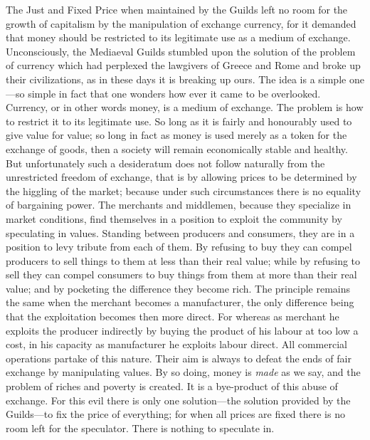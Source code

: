 \documentclass{book}
\begin{document}
The Just and Fixed Price when maintained by the Guilds left no room for the growth of capitalism by the manipulation of exchange currency, for it demanded that money should be restricted to its legitimate use as a medium of exchange. Unconsciously, the Mediaeval Guilds stumbled upon the solution of the problem of currency which had perplexed the lawgivers of Greece and Rome and broke up their civilizations, as in these days it is breaking up ours. The idea is a simple one—so simple in fact that one wonders how ever it came to be overlooked. Currency, or in other words money, is a medium of exchange. The problem is how to restrict it to its legitimate use. So long as it is fairly and honourably used to give value for value; so long in fact as money is used merely as a token for the exchange of goods, then a society will remain economically stable and healthy. But unfortunately such a desideratum does not follow naturally from the unrestricted freedom of exchange, that is by allowing prices to be determined by the higgling of the market; because under such circumstances there is no equality of bargaining power. The merchants and middlemen, because they specialize in market conditions, find themselves in a position to exploit the community by speculating in values. Standing between producers and consumers, they are in a position to levy tribute from each of them. By refusing to buy they can compel producers to sell things to them at less than their real value; while by refusing to sell they can compel consumers to buy things from them at more than their real value; and by pocketing the difference they become rich. The principle remains the same when the merchant becomes a manufacturer, the only difference being that the exploitation becomes then more direct. For whereas as merchant he exploits the producer indirectly by buying the product of his labour at too low a cost, in his capacity as manufacturer he exploits labour direct. All commercial operations partake of this nature. Their aim is always to defeat the ends of fair exchange by manipulating values. By so doing, money is \emph{made} as we say, and the problem of riches and poverty is created. It is a bye-product of this abuse of exchange. For this evil there is only one solution—the solution provided by the Guilds—to fix the price of everything; for when all prices are fixed there is no room left for the speculator. There is nothing to speculate in.
\end{document}
